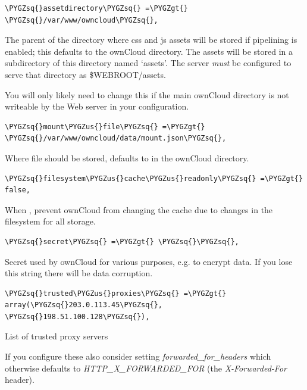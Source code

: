 \documentclass[letterpaper,10pt,english]{sphinxmanual}
\def\PYGZus{\char`\_}
\def\PYGZgt{\char`\>}
\def\PYGZsq{\char`\'}
\renewcommand\PYGZsq{\textquotesingle}
\begin{document}
\begin{Verbatim}[commandchars=\\\{\}]
\PYGZsq{}assetdirectory\PYGZsq{} =\PYGZgt{} \PYGZsq{}/var/www/owncloud\PYGZsq{},
\end{Verbatim}

The parent of the directory where css and js assets will be stored if
pipelining is enabled; this defaults to the ownCloud directory. The assets
will be stored in a subdirectory of this directory named `assets'. The
server \emph{must} be configured to serve that directory as \$WEBROOT/assets.

You will only likely need to change this if the main ownCloud directory
is not writeable by the Web server in your configuration.

\begin{Verbatim}[commandchars=\\\{\}]
\PYGZsq{}mount\PYGZus{}file\PYGZsq{} =\PYGZgt{} \PYGZsq{}/var/www/owncloud/data/mount.json\PYGZsq{},
\end{Verbatim}

Where  file should be stored, defaults to 
in the ownCloud directory.

\begin{Verbatim}[commandchars=\\\{\}]
\PYGZsq{}filesystem\PYGZus{}cache\PYGZus{}readonly\PYGZsq{} =\PYGZgt{} false,
\end{Verbatim}

When , prevent ownCloud from changing the cache due to changes in the
filesystem for all storage.

\begin{Verbatim}[commandchars=\\\{\}]
\PYGZsq{}secret\PYGZsq{} =\PYGZgt{} \PYGZsq{}\PYGZsq{},
\end{Verbatim}

Secret used by ownCloud for various purposes, e.g. to encrypt data. If you
lose this string there will be data corruption.

\begin{Verbatim}[commandchars=\\\{\}]
\PYGZsq{}trusted\PYGZus{}proxies\PYGZsq{} =\PYGZgt{} array(\PYGZsq{}203.0.113.45\PYGZsq{}, \PYGZsq{}198.51.100.128\PYGZsq{}),
\end{Verbatim}

List of trusted proxy servers

If you configure these also consider setting \emph{forwarded\_for\_headers} which
otherwise defaults to \emph{HTTP\_X\_FORWARDED\_FOR} (the \emph{X-Forwarded-For} header).
\end{document}
